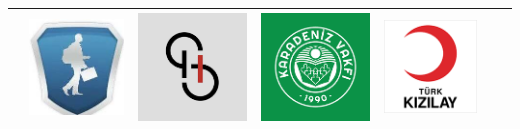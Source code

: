 \documentclass[10pt,a4paper]{altacv}
\begin{document}
\begin{center}
{\begin{tabular}{ |c c c c c|c c| }
 &{\href{http://ogrencikariyeri.com/index.html}{\includegraphics[scale=0.16]{ok.jpeg}}}
 &{\href{https://startuphukuku.com}{\includegraphics[scale=0.15]{sh.png}}}
 &{\href{http://www.karadenizvakfi.org}{\includegraphics[scale=0.15]{karvak.png}}}
 &{\href{https://www.kizilay.org.tr/Home/Index}{\includegraphics[scale=0.17]{kizilay.png}}}\\
 \hline
\end{tabular}
}
\end{center}

\clearpage









\clearpage
\end{document}
